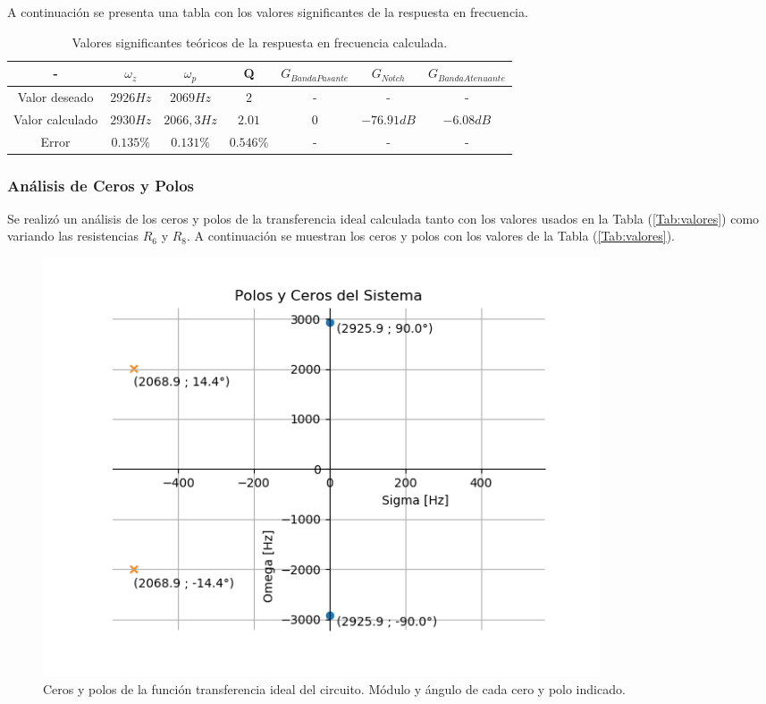 A continuación se presenta una tabla con los valores significantes de la respuesta en frecuencia.

\begin{table}[H]
\centering
\begin{tabular}{@{}ccccccc@{}}
\toprule
- & $\omega_z$ & $\omega_p$ & Q & $G_{Banda Pasante}$  & $G_{Notch}$ & $G_{Banda Atenuante}$ \\ \midrule
Valor deseado & $2926Hz$ & $2069Hz$ & $2$ & - & - & - \\
Valor calculado & $2930Hz$ & $2066,3Hz$ & $2.01$ & $0$ & $-76.91dB$ & $-6.08dB$ \\ 
Error & $0.135\%$ & $0.131\%$ & $0.546\%$ & - & - & - \\ \bottomrule
\end{tabular}
\caption{Valores significantes teóricos de la respuesta en frecuencia calculada.}
\label{tab:rta_freq_calc}
\end{table}

\subsubsection{Análisis de Ceros y Polos}

Se realizó un análisis de los ceros y polos de la transferencia ideal calculada tanto con los valores usados en la Tabla (\ref{Tab:valores}) como variando las resistencias $R_6$ y $R_8$.
A continuación se muestran los ceros y polos con los valores de la Tabla (\ref{Tab:valores}).

\begin{figure} [H]
	\centering
	\includegraphics[width=0.8\textwidth]{Imagenes1/cerosypolos_calc.PNG}
	\caption{Ceros y polos de la función transferencia ideal del circuito. Módulo y ángulo de cada cero y polo indicado.}
	\label{fig:cerosypolos_calc}
\end{figure}

